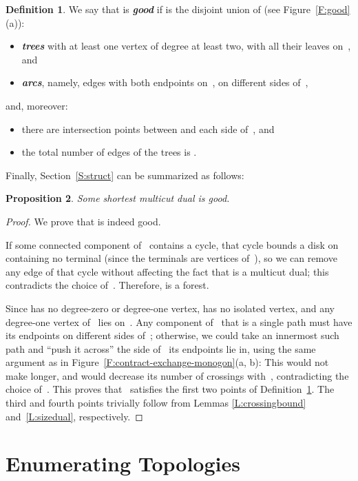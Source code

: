 \documentclass[11pt]{article}
\newcommand{\emphdef}[1]{\textcolor{blueblack}{\textbf{\emph{#1}}}}
\theoremstyle{plain}  \newtheorem{theorem}{Theorem}[section]
\newtheorem{proposition}[theorem]{Proposition}
\theoremstyle{definition}
\newtheorem{definition}[theorem]{Definition}
\begin{document}
\begin{definition}\label{D:good}
  We say that  is \emphdef{good} if  is the disjoint union of (see
  Figure~\ref{F:good}(a)):
  \begin{itemize}
  \item \emphdef{trees} with at least one vertex of degree at least two,
    with all their leaves on~, and
  \item \emphdef{arcs}, namely, edges with both endpoints on~,
    on different sides of~,
  \end{itemize}
  and, moreover:
  \begin{itemize}
  \item there are  intersection points between  and each side
    of~, and
  \item the total number of edges of the trees is .
  \end{itemize}
\end{definition}
Finally, Section~\ref{S:struct} can be summarized as follows:
\begin{proposition}\label{P:struct}
  Some shortest multicut dual is good.
\end{proposition}
\begin{proof}
  We prove that  is indeed good.

  If some connected component of~ contains a cycle, that cycle
  bounds a disk on~ containing no terminal (since the terminals are
  vertices of~), so we can remove any edge of that cycle without
  affecting the fact that  is a multicut dual; this contradicts the
  choice of~.  Therefore,  is a forest.

  Since  has no degree-zero or degree-one vertex,  has no
  isolated vertex, and any degree-one vertex of~ lies on~.  Any component of~ that is a single path must have its
  endpoints on different sides of~; otherwise, we could take an
  innermost such path and ``push it across'' the side of~ its
  endpoints lie in, using the same argument as in
  Figure~\ref{F:contract-exchange-monogon}(a, b): This would not make 
  longer, and would decrease its number of crossings with~,
  contradicting the choice of~.  This proves that ~satisfies the
  first two points of Definition~\ref{D:good}.  The third and fourth points
  trivially follow from Lemmas \ref{L:crossingbound} and~\ref{L:sizedual},
  respectively.
\end{proof}

\section{Enumerating Topologies}\label{S:enum}
\end{document}
